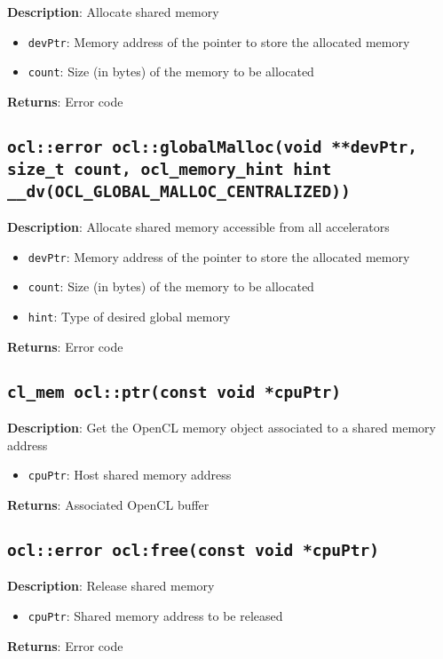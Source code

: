 \textbf{Description}: Allocate shared memory
\begin{itemize}
  \item \texttt{devPtr}: Memory address of the pointer to store the allocated memory
  \item \texttt{count}: Size (in bytes) of the memory to be allocated
\end{itemize}
\textbf{Returns}: Error code

\subsection{\texttt{ocl::error ocl::globalMalloc(void **devPtr, size\_t count, ocl\_memory\_hint 
hint \_\_dv(OCL\_GLOBAL\_MALLOC\_CENTRALIZED))}}

\textbf{Description}: Allocate shared memory accessible from all accelerators
\begin{itemize}
  \item \texttt{devPtr}: Memory address of the pointer to store the allocated memory
  \item \texttt{count}: Size (in bytes) of the memory to be allocated
  \item \texttt{hint}: Type of desired global memory
\end{itemize}
\textbf{Returns}: Error code

\subsection{\texttt{cl\_mem ocl::ptr(const void *cpuPtr)}}

\textbf{Description}: Get the OpenCL memory object associated to a shared memory address
\begin{itemize}
  \item \texttt{cpuPtr}: Host shared memory address
\end{itemize}
\textbf{Returns}: Associated OpenCL buffer

\subsection{\texttt{ocl::error ocl:free(const void *cpuPtr)}}

\textbf{Description}: Release shared memory
\begin{itemize}
  \item \texttt{cpuPtr}: Shared memory address to be released
\end{itemize}
\textbf{Returns}: Error code

